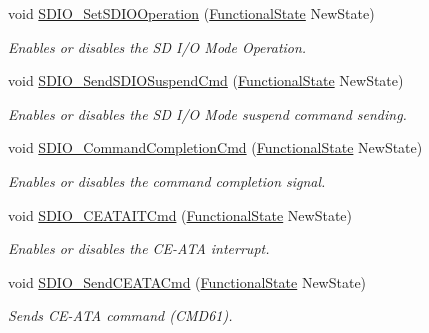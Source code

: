 \begin{DoxyCompactItemize}
void \mbox{\hyperlink{group___s_d_i_o___exported___functions_ga24e210c185d5a7855cbaff4472a8f8d1}{S\+D\+I\+O\+\_\+\+Set\+S\+D\+I\+O\+Operation}} (\mbox{\hyperlink{group___exported__types_gac9a7e9a35d2513ec15c3b537aaa4fba1}{Functional\+State}} New\+State)
\begin{DoxyCompactList}\small\item\em Enables or disables the SD I/O Mode Operation. \end{DoxyCompactList}\item 
void \mbox{\hyperlink{group___s_d_i_o___exported___functions_ga9264137a01a1ab81d03bc80a3b3120fc}{S\+D\+I\+O\+\_\+\+Send\+S\+D\+I\+O\+Suspend\+Cmd}} (\mbox{\hyperlink{group___exported__types_gac9a7e9a35d2513ec15c3b537aaa4fba1}{Functional\+State}} New\+State)
\begin{DoxyCompactList}\small\item\em Enables or disables the SD I/O Mode suspend command sending. \end{DoxyCompactList}\item 
void \mbox{\hyperlink{group___s_d_i_o___exported___functions_ga1bbe98c629812bc62121d9c8b2c5e21b}{S\+D\+I\+O\+\_\+\+Command\+Completion\+Cmd}} (\mbox{\hyperlink{group___exported__types_gac9a7e9a35d2513ec15c3b537aaa4fba1}{Functional\+State}} New\+State)
\begin{DoxyCompactList}\small\item\em Enables or disables the command completion signal. \end{DoxyCompactList}\item 
void \mbox{\hyperlink{group___s_d_i_o___exported___functions_gab44b8cbc21be000a291563076159503b}{S\+D\+I\+O\+\_\+\+C\+E\+A\+T\+A\+I\+T\+Cmd}} (\mbox{\hyperlink{group___exported__types_gac9a7e9a35d2513ec15c3b537aaa4fba1}{Functional\+State}} New\+State)
\begin{DoxyCompactList}\small\item\em Enables or disables the C\+E-\/\+A\+TA interrupt. \end{DoxyCompactList}\item 
void \mbox{\hyperlink{group___s_d_i_o___exported___functions_ga8dc7f17804bdb745b42f6647c8487b4c}{S\+D\+I\+O\+\_\+\+Send\+C\+E\+A\+T\+A\+Cmd}} (\mbox{\hyperlink{group___exported__types_gac9a7e9a35d2513ec15c3b537aaa4fba1}{Functional\+State}} New\+State)
\begin{DoxyCompactList}\small\item\em Sends C\+E-\/\+A\+TA command (C\+M\+D61). \end{DoxyCompactList}\item 

\end{DoxyCompactItemize}
